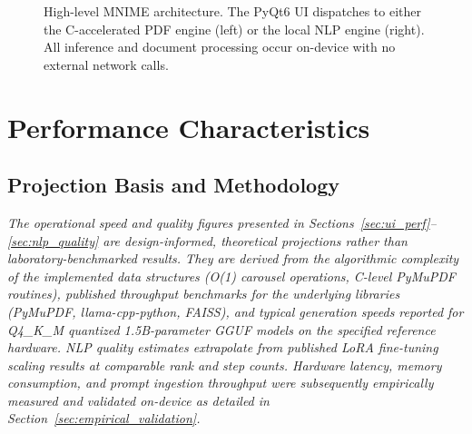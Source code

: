 \documentclass[11pt]{article}
\begin{document}
\begin{figure}[h!]
\centering
{}

\caption{High-level MNIME architecture. The PyQt6 UI dispatches to either the
C-accelerated PDF engine (left) or the local NLP engine (right). All
inference and document processing occur on-device with no external network calls.}
\label{fig:architecture}
\end{figure}

\section{Performance Characteristics}
\label{sec:eval}

\subsection{Projection Basis and Methodology}

\textit{The operational speed and quality figures presented in
Sections~\ref{sec:ui_perf}--\ref{sec:nlp_quality} are design-informed,
theoretical projections rather than laboratory-benchmarked results.
They are derived from the algorithmic complexity of the implemented
data structures (O(1) carousel operations, C-level PyMuPDF routines),
published throughput benchmarks for the underlying libraries
(PyMuPDF, llama-cpp-python, FAISS), and typical generation speeds
reported for Q4\_K\_M quantized 1.5B-parameter GGUF models on the
specified reference hardware.
NLP quality estimates extrapolate from published LoRA fine-tuning
scaling results at comparable rank and step counts.
Hardware latency, memory consumption, and prompt ingestion throughput
were subsequently empirically measured and validated on-device as detailed in
Section~\ref{sec:empirical_validation}.}
\end{document}
